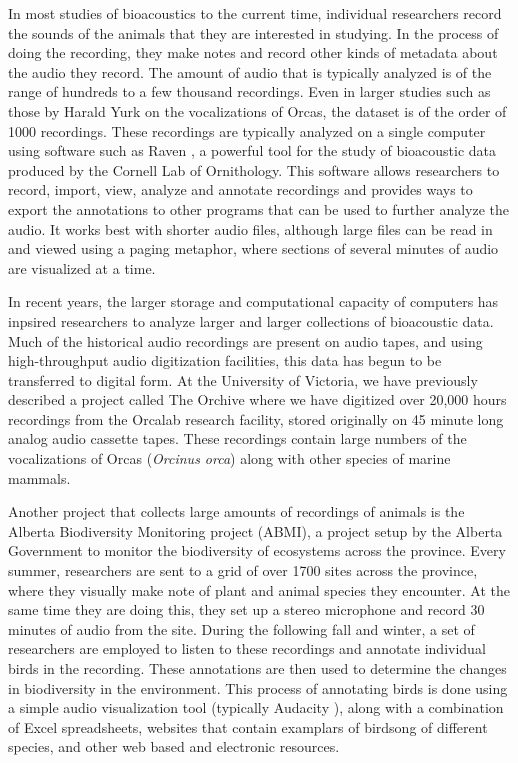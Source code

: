 In most studies of bioacoustics to the current time, individual
researchers record the sounds of the animals that they are interested
in studying.  In the process of doing the recording, they make notes
and record other kinds of metadata about the audio they record.  The
amount of audio that is typically analyzed is of the range of hundreds
to a few thousand recordings.  Even in larger studies such as those by
Harald Yurk on the vocalizations of Orcas, the dataset is of the order
of 1000 recordings.  These recordings are typically analyzed on a
single computer using software such as Raven \cite{ravenpro}, a
powerful tool for the study of bioacoustic data produced by the
Cornell Lab of Ornithology.  This software allows researchers to
record, import, view, analyze and annotate recordings and provides
ways to export the annotations to other programs that can be used to
further analyze the audio.  It works best with shorter audio files,
although large files can be read in and viewed using a paging
metaphor, where sections of several minutes of audio are visualized at
a time.

In recent years, the larger storage and computational capacity of
computers has inpsired researchers to analyze larger and larger
collections of bioacoustic data.  Much of the historical audio
recordings are present on audio tapes, and using high-throughput audio
digitization facilities, this data has begun to be transferred to
digital form.  At the University of Victoria, we have previously
described a project called The Orchive \cite{sness2008} where we have
digitized over 20,000 hours recordings from the Orcalab research
facility, stored originally on 45 minute long analog audio cassette
tapes.  These recordings contain large numbers of the vocalizations of
Orcas (\textit{Orcinus orca}) along with other species of marine
mammals.

Another project that collects large amounts of recordings of animals
is the Alberta Biodiversity Monitoring project (ABMI), a project setup
by the Alberta Government to monitor the biodiversity of ecosystems
across the province.  Every summer, researchers are sent to a grid of
over 1700 sites across the province, where they visually make note of
plant and animal species they encounter.  At the same time they are
doing this, they set up a stereo microphone and record 30 minutes of
audio from the site.  During the following fall and winter, a set of
researchers are employed to listen to these recordings and annotate
individual birds in the recording.  These annotations are then used to
determine the changes in biodiversity in the environment.  This
process of annotating birds is done using a simple audio visualization
tool (typically Audacity \cite{audacity}), along with a combination of
Excel spreadsheets, websites that contain examplars of birdsong of
different species, and other web based and electronic resources.

